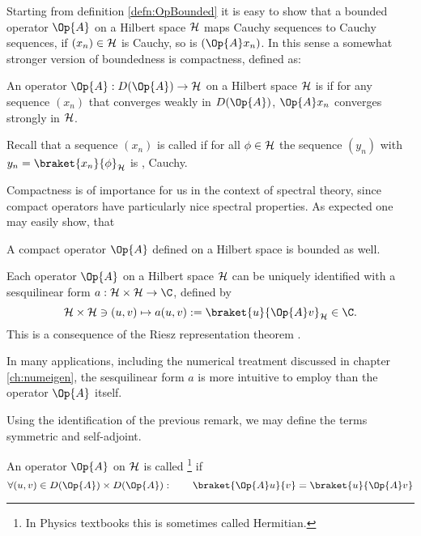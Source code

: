 Starting from definition \ref{defn:OpBounded}
it is easy to show that a bounded operator $\Op{A}$ on a Hilbert
space $\mathcal{H}$ maps Cauchy sequences to Cauchy sequences,
\ie if $(x_n) \in \mathcal{H}$ is Cauchy, so is $(\Op{A} x_n)$.
In this sense a somewhat stronger version of boundedness
is compactness, defined as:
\begin{defn}
	An operator $\Op{A} : D(\Op{A}) \to \hilbert$ on a Hilbert space $\mathcal{H}$
	is 
	if for any sequence $(x_n)$ that converges weakly in $D(\Op{A})$,
	$\Op{A} x_n$ converges strongly in $\mathcal{H}$.

	Recall that a sequence $(x_n)$ is called 
	if for all $\phi \in \mathcal{H}$ the sequence $(y_n)$ with
	$y_n = \braket{x_n}{\phi}_\hilbert$
	is , \ie Cauchy.
\end{defn}
Compactness is of importance for us in the context of spectral theory,
since compact operators have particularly nice spectral properties.
As expected one may easily show, that~\cite{Werner2011}
\begin{prop}
	A compact operator $\Op{A}$ defined on a Hilbert space is bounded as well.
\end{prop}

\begin{rem}
\label{rem:OpRietz}
Each operator $\Op{A}$ on a Hilbert space $\mathcal{H}$ can be
uniquely identified with a sesquilinear form
$a : \hilbert \times \hilbert \to \C$, defined by
\begin{equation}
	\hilbert \times \hilbert \ni (u, v) \mapsto a(u, v) := \braket{u}{\Op{A} v}_\hilbert \in \C.
	\label{eqn:formA}
\end{equation}
This is a consequence of the Riesz representation theorem \cite{DiracNotation}.

In many applications, including the numerical treatment discussed in chapter
\vref{ch:numeigen},
the sesquilinear form $a$ is more intuitive to employ than the operator $\Op{A}$ itself.
\end{rem}

Using the identification of the previous remark,
we may define the terms symmetric and self-adjoint.
\begin{defn}
	\label{def:SymmetricOperator}
	An operator $\Op{A}$ on $\mathcal{H}$ is called %
	\footnote{In Physics textbooks this is sometimes called Hermitian.}
	if
	\[ \forall (u, v) \in D(\Op{A}) \times D(\Op{A}): \qquad \braket{\Op{A} u}{v} = \braket{u}{\Op{A} v} \]
\end{defn}

